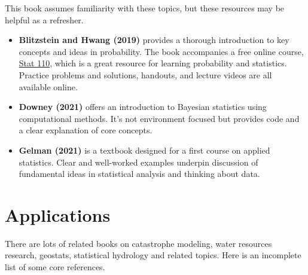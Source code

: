 \documentclass[
  letterpaper,
  DIV=11,
  numbers=noendperiod]{scrreprt}
\providecommand{\tightlist}{%
  \setlength{\itemsep}{0pt}\setlength{\parskip}{0pt}}
\begin{document}

This book assumes familiarity with these topics, but these resources may
be helpful as a refresher.

\begin{itemize}
\tightlist
\item
  \textbf{Blitzstein and Hwang (2019)} provides a thorough introduction
  to key concepts and ideas in probability. The book accompanies a free
  online course,
  \href{https://projects.iq.harvard.edu/stat110/home}{Stat 110}, which
  is a great resource for learning probability and statistics. Practice
  problems and solutions, handouts, and lecture videos are all available
  online.
\item
  \textbf{Downey (2021)} offers an introduction to Bayesian statistics
  using computational methods. It's not environment focused but provides
  code and a clear explanation of core concepts.
\item
  \textbf{Gelman (2021)} is a textbook designed for a first course on
  applied statistics. Clear and well-worked examples underpin discussion
  of fundamental ideas in statistical analysis and thinking about data.
\end{itemize}

\section*{Applications}\label{applications}


There are lots of related books on catastrophe modeling, water resources
research, geostats, statistical hydrology and related topics. Here is an
incomplete list of some core references.
\end{document}
